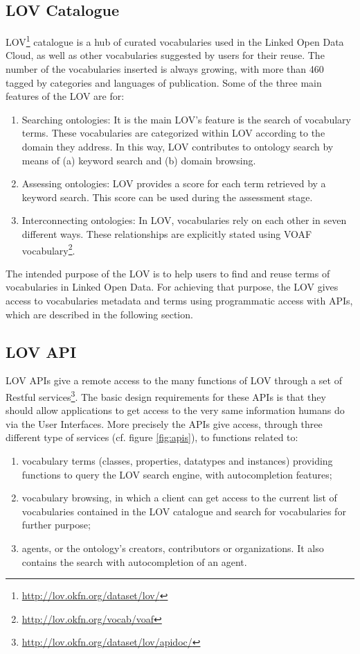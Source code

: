 \subsection{LOV Catalogue} 
LOV\footnote{\url{http://lov.okfn.org/dataset/lov/}} catalogue \cite{vandenbusschelov} is a hub of curated vocabularies used in the Linked Open Data Cloud, as well as other vocabularies suggested by users for their reuse. The number of the vocabularies inserted is always growing, with more than 460 tagged by categories and languages of publication. Some of the three main features of the LOV are for:
\begin{enumerate}
\item Searching ontologies: It is the main LOV's feature is the search of vocabulary terms. These vocabularies are categorized within LOV according to the domain they address. In this way, LOV contributes to ontology search by means of (a) keyword search and (b) domain browsing.
 \item Assessing ontologies: LOV provides a score for each term retrieved by a keyword search. This score can be used during the assessment stage.
 \item Interconnecting ontologies: In LOV, vocabularies rely on each other in seven different ways. These relationships are explicitly stated using VOAF vocabulary\footnote{\url{http://lov.okfn.org/vocab/voaf}}. 
\end{enumerate}

The intended purpose of the LOV is to help users to find and reuse terms of vocabularies in Linked Open Data. For achieving that purpose, the LOV gives access to vocabularies metadata and terms using programmatic access with APIs, which are described in the following section.  

\subsection{LOV API}
LOV APIs give a remote access to the many functions of LOV through a set of Restful services\footnote{\url{http://lov.okfn.org/dataset/lov/apidoc/}}. The basic design requirements for these APIs is that they should allow applications to get access to the very same information humans do via the User Interfaces. More precisely the APIs give access, through three different type of services (cf. figure \ref{fig:apis}), to functions related to:
\begin{enumerate} 
	\item vocabulary terms (classes, properties, datatypes and instances) providing functions to query the LOV search engine, with autocompletion features;
	\item vocabulary browsing, in which a client can get access to the current list of vocabularies contained in the LOV catalogue and search for vocabularies for further purpose;
	\item agents, or the ontology's creators, contributors or organizations. It also contains the search with autocompletion of an agent.
	\end{enumerate}



